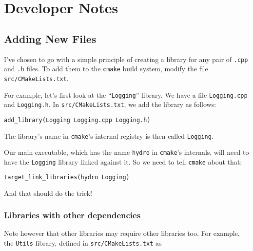 \newpage
\section{Developer Notes}


\subsection{Adding New Files}

I've chosen to go with a simple principle of creating a library for any pair of
\verb|.cpp| and \verb|.h| files. To add them to the \verb|cmake| build system,
modify the file \verb|src/CMakeLists.txt|.


For example, let's first look at the ``\verb|Logging|'' library. We have a file
\verb|Logging.cpp| and \verb|Logging.h|. In \verb|src/CMakeLists.txt|, we add
the library as follows:

\begin{lstlisting}
add_library(Logging Logging.cpp Logging.h)
\end{lstlisting}

The library's name in \verb|cmake|'s internal registry is then called
\verb|Logging|.

Our main executable, which has the name \verb|hydro| in \verb|cmake|'s
internals, will need to have the \verb|Logging| library linked against it. So
we need to tell \verb|cmake| about that:

\begin{lstlisting}
target_link_libraries(hydro Logging)
\end{lstlisting}

And that should do the trick!




\subsubsection{Libraries with other dependencies}

Note however that other libraries may require other libraries too. For example,
the \verb|Utils| library, defined in \verb|src/CMakeLists.txt| as

